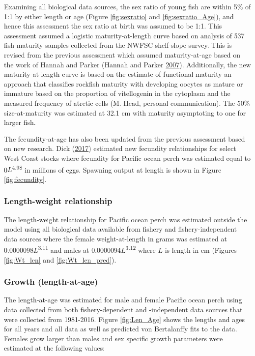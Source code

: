 \documentclass[12pt,]{article}
\begin{document}
Examining all biological data sources, the sex ratio of young fish are
within 5\% of 1:1 by either length or age (Figure \ref{fig:sexratio} and
\ref{fig:sexratio_Age}), and hence this assessment the sex ratio at
birth was assumed to be 1:1. This assessment assumed a logistic
maturity-at-length curve based on analysis of 537 fish maturity samples
collected from the NWFSC shelf-slope survey. This is revised from the
previous assessment which assumed maturity-at-age based on the work of
Hannah and Parker (Hannah and Parker
\protect\hyperlink{ref-hannah_age-modulated_2007}{2007}). Additionally,
the new maturity-at-length curve is based on the estimate of functional
maturity an approach that classifies rockfish maturity with developing
oocytes as mature or immature based on the proportion of vitellogenin in
the cytoplasm and the measured frequency of atretic cells (M. Head,
personal communication). The 50\% size-at-maturity was estimated at 32.1
cm with maturity asymptoting to one for larger fish.

The fecundity-at-age has also been updated from the previous assessment
based on new research. Dick
(\protect\hyperlink{ref-dick_meta-analysis_2017}{2017}) estimated new
fecundity relationships for select West Coast stocks where fecundity for
Pacific ocean perch was estimated equal to 0\(L\)\textsuperscript{4.98}
in millions of eggs. Spawning output at length is shown in Figure
\ref{fig:fecundity}.

\subsubsection{Length-weight
relationship}\label{length-weight-relationship}

The length-weight relationship for Pacific ocean perch was estimated
outside the model using all biological data available from fishery and
fishery-independent data sources where the female weight-at-length in
grams was estimated at 0.0000098\(L\)\textsuperscript{3.11} and males at
0.0000094\(L\)\textsuperscript{3.12} where \(L\) is length in cm
(Figures \ref{fig:Wt_len} and \ref{fig:Wt_len_pred}).

\subsubsection{Growth (length-at-age)}\label{growth-length-at-age}

The length-at-age was estimated for male and female Pacific ocean perch
using data collected from both fishery-dependent and -independent data
sources that were collected from 1981-2016. Figure \ref{fig:Len_Age}
shows the lengths and ages for all years and all data as well as
predicted von Bertalanffy fits to the data. Females grow larger than
males and sex specific growth parameters were estimated at the following
values:
\end{document}
